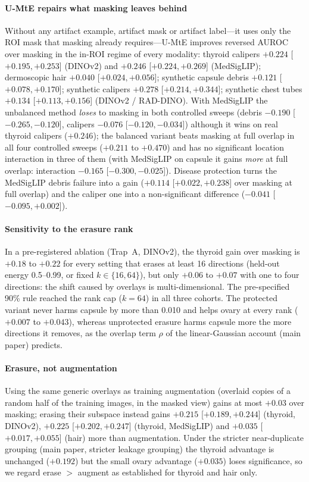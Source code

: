 \paragraph{U-MtE repairs what masking leaves behind}
Without any artifact example, artifact mask or artifact label---it uses only the ROI mask that masking already
requires---U-MtE improves reversed AUROC over masking in the in-ROI regime of
every modality: thyroid calipers $+0.224$ [$+0.195, +0.253$] (DINOv2) and $+0.246$ [$+0.224, +0.269$] (MedSigLIP);
dermoscopic hair $+0.040$ [$+0.024, +0.056$]; synthetic capsule debris $+0.121$ [$+0.078, +0.170$]; synthetic
calipers $+0.278$ [$+0.214, +0.344$]; synthetic chest tubes $+0.134$ [$+0.113, +0.156$] (DINOv2 / RAD-DINO).
With MedSigLIP the unbalanced method \emph{loses} to masking in both controlled sweeps (debris $-0.190$
[$-0.265, -0.120$], calipers $-0.076$ [$-0.120, -0.034$]) although it wins on real thyroid calipers ($+0.246$);
the balanced variant beats masking at full overlap in all four controlled sweeps ($+0.211$ to $+0.470$) and has no
significant location interaction in three of them (with MedSigLIP on capsule it gains \emph{more} at full overlap:
interaction $-0.165$ [$-0.300, -0.025$]). Disease protection turns the MedSigLIP debris failure into a gain ($+0.114$
[$+0.022, +0.238$] over masking at full overlap) and the caliper one into a non-significant difference ($-0.041$
[$-0.095, +0.002$]).

\paragraph{Sensitivity to the erasure rank} In a pre-registered ablation (Trap~A, DINOv2), the thyroid gain over masking
is $+0.18$ to $+0.22$ for every setting that erases at least 16 directions (held-out energy 0.5--0.99, or fixed
$k\in\{16,64\}$), but only $+0.06$ to $+0.07$ with one to four directions: the shift caused by overlays is
multi-dimensional. The pre-specified 90\% rule reached the rank cap ($k=64$) in all three cohorts. The protected
variant never harms capsule by more than 0.010 and helps ovary at every rank ($+0.007$ to $+0.043$), whereas
unprotected erasure harms capsule more the more directions it removes, as the overlap term $\rho$ of
the linear-Gaussian account (main paper) predicts.

\paragraph{Erasure, not augmentation}
Using the same generic overlays as training augmentation (overlaid copies of a random half of the training images,
in the masked view) gains at most $+0.03$ over masking; erasing their subspace instead gains $+0.215$
[$+0.189, +0.244$] (thyroid, DINOv2), $+0.225$ [$+0.202, +0.247$] (thyroid, MedSigLIP) and $+0.035$
[$+0.017, +0.055$] (hair) more than augmentation. Under the stricter near-duplicate grouping
(main paper, stricter leakage grouping) the thyroid advantage is unchanged ($+0.192$) but the small ovary advantage
($+0.035$) loses significance, so we regard erase $>$ augment as established for thyroid and hair only.

